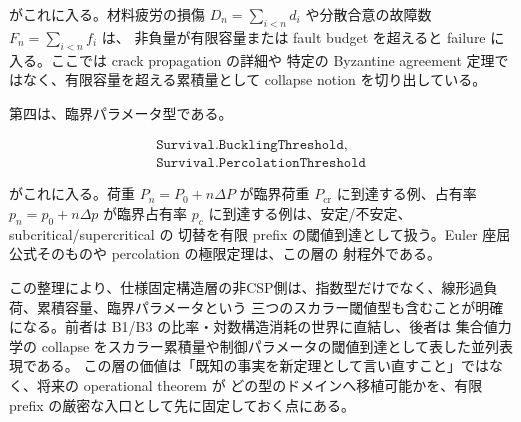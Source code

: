 \documentclass[12pt,a4paper]{article}
\begin{document}
がこれに入る。材料疲労の損傷 \(D_{n}=\sum_{i<n}d_{i}\) や分散合意の故障数 \(F_{n}=\sum_{i<n}f_{i}\) は、 非負量が有限容量または fault budget を超えると failure に入る。ここでは crack propagation の詳細や 特定の Byzantine agreement 定理ではなく、有限容量を超える累積量として collapse notion を切り出している。

第四は、臨界パラメータ型である。

\[
\begin{aligned}
\texttt{Survival.BucklingThreshold},\quad \\
\texttt{Survival.PercolationThreshold}
\end{aligned}
\]

がこれに入る。荷重 \(P_{n}=P_0+n\Delta P\) が臨界荷重 \(P_{\mathrm{cr}}\) に到達する例、占有率 \(p_{n}=p_0+n\Delta p\) が臨界占有率 \(p_{c}\) に到達する例は、安定/不安定、subcritical/supercritical の 切替を有限 prefix の閾値到達として扱う。Euler 座屈公式そのものや percolation の極限定理は、この層の 射程外である。

この整理により、仕様固定構造層の非CSP側は、指数型だけでなく、線形過負荷、累積容量、臨界パラメータという 三つのスカラー閾値型も含むことが明確になる。前者は B1/B3 の比率・対数構造消耗の世界に直結し、後者は 集合値力学の collapse をスカラー累積量や制御パラメータの閾値到達として表した並列表現である。 この層の価値は「既知の事実を新定理として言い直すこと」ではなく、将来の operational theorem が どの型のドメインへ移植可能かを、有限 prefix の厳密な入口として先に固定しておく点にある。
\end{document}
